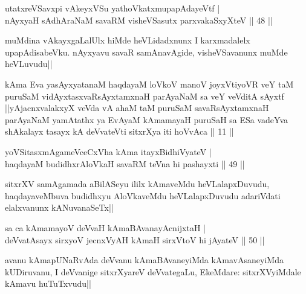\begin{shl}
utatxreVSavxpi vAkeyxVSu yathoVkatxmupapAdayeVtf |\\
nAyxyaH sAdhAraNaM savaRM visheVSasutx parxvakaSxyXteV \hfill || 48 ||
\end{shl}

\begin{artha}
muMdina vAkayxgaLalUlx hiMde heVLidadxnunx I karxmadalelx upapAdisabeVku. nAyxyavu savaR samAnavAgide, visheVSavanunx muMde heVLuvudu||
\end{artha}

\begin{shl}
kAma Eva yasAyxyatanaM haqdayaM loVkoV manoV joyxVtiyoVR veY taM puruSaM vidAyxtasxvaRsAyxtamxnaH parAyaNaM sa veY veVditA sAyxtf ||yAjacnxvalakxyX veVda vA ahaM taM puruSaM savaRsAyxtamxnaH parAyaNaM yamAtathx ya EvAyaM kAmamayaH puruSaH sa ESa vadeYva shAkalayx tasayx kA deVvateVti sitxrXya iti hoVvAca || 11 ||
\end{shl}


\begin{shl}
yoVSitasxmAgameVceCxVha kAma itayxBidhiVyateV |\\
haqdayaM budidhxrAloVkaH savaRM teVna hi pashayxti \hfill || 49 ||
\end{shl}

\begin{artha}
sitxrXV samAgamada aBilASeyu ililx kAmaveMdu heVLalapxDuvudu, haqdayaveMbuva budidhxyu AloVkaveMdu heVLalapxDuvudu adariVdati elalxvanunx kANuvanaSeTx|| 
\end{artha}

\begin{shl}
sa ca kAmamayoV deVvaH kAmaBAvanayA\s cnijxtaH |\\
deVvatA\s sayx sirxyoV jecnxVyAH kAmaH sirxVtoV hi jAyateV \hfill || 50 ||
\end{shl}

\begin{artha}
avanu kAmapUNaRvAda deVvanu kAmaBAvaneyiMda kAmavAsaneyiMda kUDiruvanu, I deVvanige sitxrXyareV deVvategaLu, EkeMdare: sitxrXVyiMdale kAmavu huTuTxvudu||
\end{artha}
